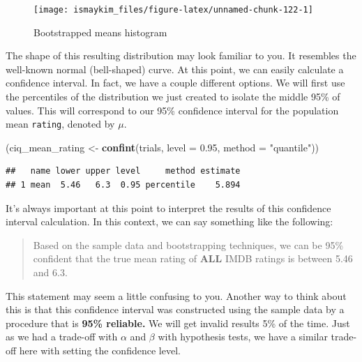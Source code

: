 \documentclass[]{tufte-book}
\newenvironment{Shaded}{\begin{snugshade}}{\end{snugshade}}
\newcommand{\KeywordTok}[1]{\textcolor[rgb]{0.13,0.29,0.53}{\textbf{{#1}}}}
\newcommand{\DataTypeTok}[1]{\textcolor[rgb]{0.13,0.29,0.53}{{#1}}}
\newcommand{\FloatTok}[1]{\textcolor[rgb]{0.00,0.00,0.81}{{#1}}}
\newcommand{\StringTok}[1]{\textcolor[rgb]{0.31,0.60,0.02}{{#1}}}
\newcommand{\NormalTok}[1]{{#1}}
\begin{document}
\begin{figure}

{\centering \texttt{[image: ismaykim\_files/figure-latex/unnamed-chunk-122-1]} 

}

\caption[Bootstrapped means histogram]{Bootstrapped means histogram}\label{fig:unnamed-chunk-122}
\end{figure}

The shape of this resulting distribution may look familiar to you. It
resembles the well-known normal (bell-shaped) curve. At this point, we
can easily calculate a confidence interval. In fact, we have a couple
different options. We will first use the percentiles of the distribution
we just created to isolate the middle 95\% of values. This will
correspond to our 95\% confidence interval for the population mean
\texttt{rating}, denoted by \(\mu\).

\begin{Shaded}
\begin{Highlighting}[]
\NormalTok{(ciq_mean_rating <-}\StringTok{ }\KeywordTok{confint}\NormalTok{(trials, }\DataTypeTok{level =} \FloatTok{0.95}\NormalTok{, }\DataTypeTok{method =} \StringTok{"quantile"}\NormalTok{))}
\end{Highlighting}
\end{Shaded}

\begin{verbatim}
##   name lower upper level     method estimate
## 1 mean  5.46   6.3  0.95 percentile    5.894
\end{verbatim}

It's always important at this point to interpret the results of this
confidence interval calculation. In this context, we can say something
like the following:

\begin{quote}
Based on the sample data and bootstrapping techniques, we can be 95\%
confident that the true mean rating of \textbf{ALL} IMDB ratings is
between 5.46 and 6.3.
\end{quote}

This statement may seem a little confusing to you. Another way to think
about this is that this confidence interval was constructed using the
sample data by a procedure that is \textbf{95\% reliable.} We will get
invalid results 5\% of the time. Just as we had a trade-off with
\(\alpha\) and \(\beta\) with hypothesis tests, we have a similar
trade-off here with setting the confidence level.
\end{document}
